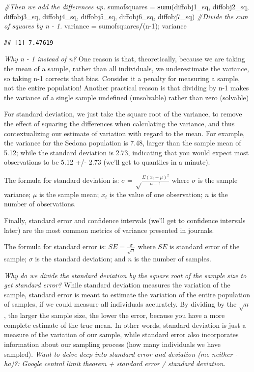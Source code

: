 \documentclass[
]{book}
\newenvironment{Shaded}{\begin{snugshade}}{\end{snugshade}}
\newcommand{\CommentTok}[1]{\textcolor[rgb]{0.56,0.35,0.01}{\textit{#1}}}
\newcommand{\DecValTok}[1]{\textcolor[rgb]{0.00,0.00,0.81}{#1}}
\newcommand{\FunctionTok}[1]{\textcolor[rgb]{0.13,0.29,0.53}{\textbf{#1}}}
\newcommand{\NormalTok}[1]{#1}
\newcommand{\OtherTok}[1]{\textcolor[rgb]{0.56,0.35,0.01}{#1}}
\newcommand{\SpecialCharTok}[1]{\textcolor[rgb]{0.81,0.36,0.00}{\textbf{#1}}}
\begin{document}
\begin{Shaded}
\begin{Highlighting}[]
\CommentTok{\#Then we add the differences up.}
\NormalTok{sumofsquares }\OtherTok{=} \FunctionTok{sum}\NormalTok{(diffobj1\_sq, diffobj2\_sq, diffobj3\_sq, diffobj4\_sq, diffobj5\_sq, diffobj6\_sq, diffobj7\_sq)}
\CommentTok{\#Divide the sum of squares by n {-} 1.}
\NormalTok{variance }\OtherTok{=}\NormalTok{ sumofsquares}\SpecialCharTok{/}\NormalTok{(n}\DecValTok{{-}1}\NormalTok{); variance }
\end{Highlighting}
\end{Shaded}

\begin{verbatim}
## [1] 7.47619
\end{verbatim}

\emph{Why n - 1 instead of n?}
One reason is that, theoretically, because we are taking the mean of a sample, rather than all individuals, we underestimate the variance, so taking n-1 corrects that bias. Consider it a penalty for measuring a sample, not the entire population! Another practical reason is that dividing by n-1 makes the variance of a single sample undefined (unsolvable) rather than zero (solvable)

For standard deviation, we just take the square root of the variance, to remove the effect of squaring the differences when calculating the variance, and thus contextualizing our estimate of variation with regard to the mean. For example, the variance for the Sedona population is 7.48, larger than the sample mean of 5.12; while the standard deviation is 2.73, indicating that you would expect most observations to be 5.12 +/- 2.73 (we'll get to quantiles in a minute).

The formula for standard deviation is: \(\sigma = \sqrt\frac{\Sigma(x_i - \mu)^{2}}{n - 1}\)
where \(\sigma\) is the sample variance;
\(\mu\) is the sample mean;
\(x_{i}\) is the value of one observation;
\(n\) is the number of observations.

Finally, standard error and confidence intervals (we'll get to confidence intervals later) are the most common metrics of variance presented in journals.

The formula for standard error is: \(SE = \frac{\sigma}{\sqrt n}\)
where \(SE\) is standard error of the sample;
\(\sigma\) is the standard deviation; and
\(n\) is the number of samples.

\emph{Why do we divide the standard deviation by the square root of the sample size to get standard error?}
While standard deviation measures the variation of the sample, standard error is meant to estimate the variation of the entire population of samples, if we could measure all individuals accurately. By dividing by the \(\sqrt n\), the larger the sample size, the lower the error, because you have a more complete estimate of the true mean. In other words, standard deviation is just a measure of the variation of our sample, while standard error also incorporates information about our sampling process (how many individuals we have sampled). \emph{Want to delve deep into standard error and deviation (me neither - ha)?: Google central limit theorem + standard error / standard deviation.}
\end{document}

